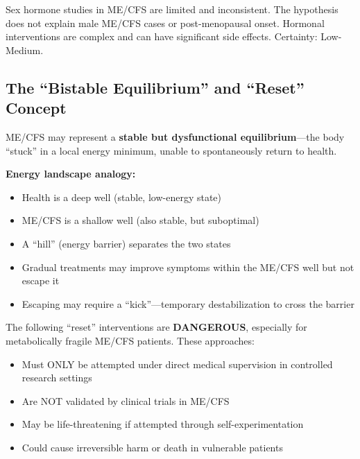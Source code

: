 \begin{warning}
Sex hormone studies in ME/CFS are limited and inconsistent. The hypothesis does not explain male ME/CFS cases or post-menopausal onset. Hormonal interventions are complex and can have significant side effects. Certainty: Low-Medium.
\end{warning}

\subsection{The ``Bistable Equilibrium'' and ``Reset'' Concept}
\label{sec:bistable-reset}

\begin{speculation}
\label{spec:bistable}
ME/CFS may represent a \textbf{stable but dysfunctional equilibrium}---the body ``stuck'' in a local energy minimum, unable to spontaneously return to health.

\textbf{Energy landscape analogy:}
\begin{itemize}
    \item Health is a deep well (stable, low-energy state)
    \item ME/CFS is a shallow well (also stable, but suboptimal)
    \item A ``hill'' (energy barrier) separates the two states
    \item Gradual treatments may improve symptoms within the ME/CFS well but not escape it
    \item Escaping may require a ``kick''---temporary destabilization to cross the barrier
\end{itemize}

\begin{warning}
\label{warn:reset-danger}
The following ``reset'' interventions are \textbf{DANGEROUS}, especially for metabolically fragile ME/CFS patients. These approaches:
\begin{itemize}
    \item Must ONLY be attempted under direct medical supervision in controlled research settings
    \item Are NOT validated by clinical trials in ME/CFS
    \item May be life-threatening if attempted through self-experimentation
    \item Could cause irreversible harm or death in vulnerable patients
\end{itemize}


\end{warning}
\end{speculation}
